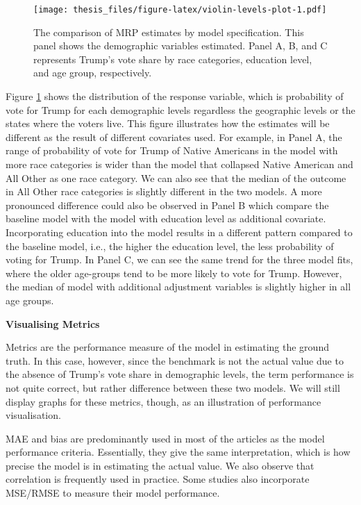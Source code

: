 \documentclass{monashthesis}
\begin{document}
\begin{figure}
\centering
\texttt{[image: thesis\_files/figure-latex/violin-levels-plot-1.pdf]}
\caption{\label{fig:violin-levels-plot}The comparison of MRP estimates by model specification. This panel shows the demographic variables estimated. Panel A, B, and C represents Trump's vote share by race categories, education level, and age group, respectively.}
\end{figure}

Figure \ref{fig:violin-levels-plot} shows the distribution of the response variable, which is probability of vote for Trump for each demographic levels regardless the geographic levels or the states where the voters live. This figure illustrates how the estimates will be different as the result of different covariates used. For example, in Panel A, the range of probability of vote for Trump of Native Americans in the model with more race categories is wider than the model that collapsed Native American and All Other as one race category. We can also see that the median of the outcome in All Other race categories is slightly different in the two models. A more pronounced difference could also be observed in Panel B which compare the baseline model with the model with education level as additional covariate. Incorporating education into the model results in a different pattern compared to the baseline model, i.e., the higher the education level, the less probability of voting for Trump. In Panel C, we can see the same trend for the three model fits, where the older age-groups tend to be more likely to vote for Trump. However, the median of model with additional adjustment variables is slightly higher in all age groups.

\textbf{Visualising Metrics}

Metrics are the performance measure of the model in estimating the ground truth. In this case, however, since the benchmark is not the actual value due to the absence of Trump's vote share in demographic levels, the term performance is not quite correct, but rather difference between these two models. We will still display graphs for these metrics, though, as an illustration of performance visualisation.

MAE and bias are predominantly used in most of the articles as the model performance criteria. Essentially, they give the same interpretation, which is how precise the model is in estimating the actual value. We also observe that correlation is frequently used in practice. Some studies also incorporate MSE/RMSE to measure their model performance.
\end{document}
